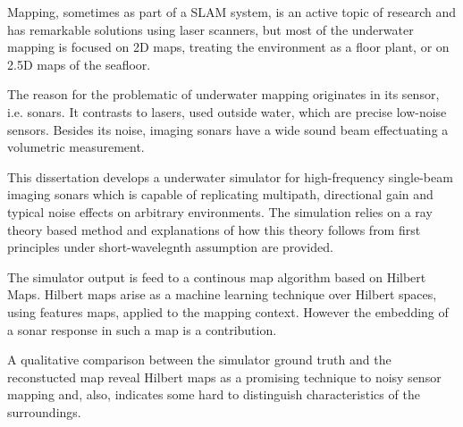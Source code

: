 Mapping, sometimes as part of a SLAM system, is an active topic of
research and has remarkable solutions using laser scanners, but most of the
underwater mapping is focused on 2D maps, treating the environment as a floor
plant, or on 2.5D maps of the seafloor.

The reason for the problematic of underwater mapping originates in its sensor,
i.e. sonars. It contrasts to lasers, used outside water, which are precise
low-noise sensors. Besides its noise, imaging sonars have a wide sound beam
effectuating a volumetric measurement.

This dissertation develops a underwater simulator for high-frequency single-beam
imaging sonars which is capable of replicating multipath, directional
gain and typical noise effects on arbitrary environments. The simulation relies
on a ray theory based method and explanations of how this theory follows from
first principles under short-wavelegnth assumption are provided.

The simulator output is feed to a continous map algorithm based on Hilbert Maps.
Hilbert maps arise as a machine learning technique over Hilbert spaces, using
features maps, applied to the mapping context. However the embedding of a sonar response in
such a map is a contribution.

A qualitative comparison between the simulator ground truth and the reconstucted
map reveal Hilbert maps as a promising technique to noisy sensor mapping and,
also, indicates some hard to distinguish characteristics of the surroundings.

